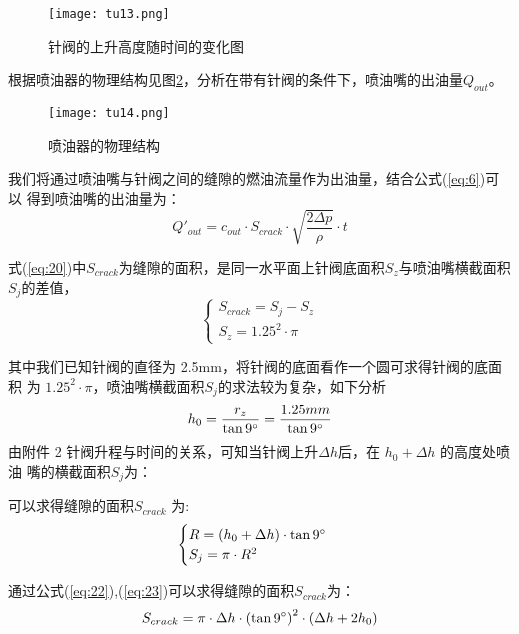 \documentclass{cumcmthesis}
\begin{document}
 \begin{figure}[H] \centering 
	
	\texttt{[image: tu13.png]} 
	
	\caption{针阀的上升高度随时间的变化图} \label{fig:13}
\end{figure}  

根据喷油器的物理结构见图\ref{fig:14}\textsuperscript{\cite{bib:ten}}，分析在带有针阀的条件下，喷油嘴的出油量$Q_{out}$。

 \begin{figure}[htb] \centering 
	
	\texttt{[image: tu14.png]} 
	
	\caption{喷油器的物理结构} \label{fig:14}
\end{figure}  


我们将通过喷油嘴与针阀之间的缝隙的燃油流量作为出油量，结合公式(\ref{eq:6})可以 得到喷油嘴的出油量为： 
\begin{equation}
Q'_{out}=c_{out}\cdot S_{crack}\cdot\sqrt{\frac{2\Delta p}{\rho}}\cdot t\label{eq:20}
\end{equation}

式(\ref{eq:20})中$S_{crack}$为缝隙的面积，是同一水平面上针阀底面积$S_{z}$与喷油嘴横截面积$S_{j}$的差值， 
\begin{equation}
\begin{cases}
S_{crack}=S_{j}-S_{z}\\
S_{z}=1.25^{2}\cdot \pi
\end{cases}\label{eq:21}
\end{equation}

其中我们已知针阀的直径为 2.5mm，将针阀的底面看作一个圆可求得针阀的底面积 为 $1.25^{2}\cdot\pi$，喷油嘴横截面积$S_{j}$的求法较为复杂，如下分析\begin{equation}
h_{0}=\frac{r_{z}}{\tan 9\degree}=\frac{1.25mm}{\tan 9\degree}\label{eq:22}
\end{equation}
 由附件 2 针阀升程与时间的关系，可知当针阀上升$\Delta h$后，在 $h_{0}+\Delta h$ 的高度处喷油 嘴的横截面积$S_{j}$为：
 
 可以求得缝隙的面积$S_{crack}$ 为:
 \begin{equation}
 	\begin{cases}
 	R=\left(h_{0}+\Delta h\right)\cdot\tan 9\degree\\
 	S_{j}=\pi\cdot R^{2}
 	\end{cases}\label{eq:23}
 \end{equation}
 
 通过公式(\ref{eq:22}),(\ref{eq:23})可以求得缝隙的面积$S_{crack}$为： 
 \begin{equation}
 S_{crack}=\pi\cdot\Delta h\cdot \left(\tan 9\degree\right)^{2}\cdot\left(\Delta h+2h_{0}\right)\label{eq:24}
 \end{equation}
 
\end{document}
